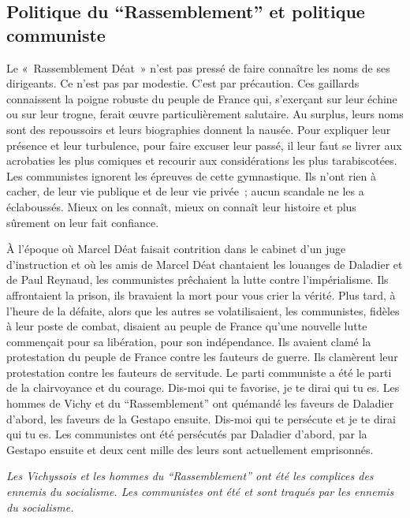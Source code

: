 \documentclass[french,twoside]{book} %
\begin{document}
\subsection[Politique du “Rassemblement” et politique communiste]{Politique du “Rassemblement” et politique communiste}
\noindent Le « Rassemblement Déat » n’est pas pressé de faire connaître les noms de ses dirigeants. Ce n’est pas par modestie. C’est par précaution. Ces gaillards connaissent la poigne robuste du peuple de France qui, s’exerçant sur leur échine ou sur leur trogne, ferait œuvre particulièrement salutaire. Au surplus, leurs noms sont des repoussoirs et leurs biographies donnent la nausée. Pour expliquer leur présence et leur turbulence, pour faire excuser leur passé, il leur faut se livrer aux acrobaties les plus comiques et recourir aux considérations les plus tarabiscotées. Les communistes ignorent les épreuves de cette gymnastique. Ils n’ont rien à cacher, de leur vie publique et de leur vie privée ; aucun scandale ne les a éclaboussés. Mieux on les connaît, mieux on connaît leur histoire et plus sûrement on leur fait confiance.\par
À l’époque où Marcel Déat faisait contrition dans le cabinet d’un juge d’instruction et où les amis de Marcel Déat chantaient les louanges de Daladier et de Paul Reynaud, les communistes prêchaient la lutte contre l’impérialisme. Ils affrontaient la prison, ils bravaient la mort pour vous crier la vérité. Plus tard, à l’heure de la défaite, alors que les autres se volatilisaient, les communistes, fidèles à leur poste de combat, disaient au peuple de France qu’une nouvelle lutte commençait pour sa libération, pour son indépendance. Ils avaient clamé la protestation du peuple de France contre les fauteurs de guerre. Ils clamèrent leur protestation contre les fauteurs de servitude. Le parti communiste a été le parti de la clairvoyance et du courage. Dis-moi qui te favorise, je te dirai qui tu es. Les hommes de Vichy et du “Rassemblement” ont quémandé les faveurs de Daladier d’abord, les faveurs de la Gestapo ensuite. Dis-moi qui te persécute et je te dirai qui tu es. Les communistes ont été persécutés par Daladier d’abord, par la Gestapo ensuite et deux cent mille des leurs sont actuellement emprisonnés.\par
{\itshape Les Vichyssois et les hommes du “Rassemblement” ont été les complices des ennemis du socialisme. Les communistes ont été et sont traqués par les ennemis du socialisme.}\par
\end{document}
